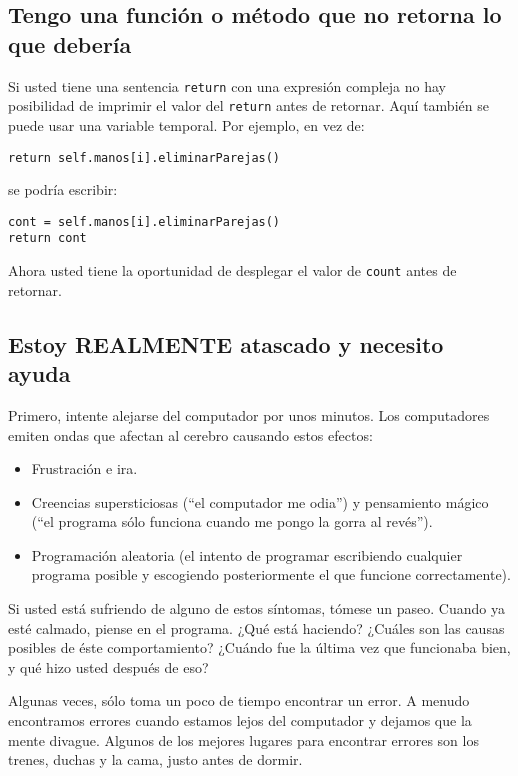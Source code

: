 \subsection{Tengo una función o método que no retorna lo que debería}

 

Si usted tiene una sentencia \texttt{return} con una expresión compleja
no hay posibilidad de imprimir el valor del \texttt{return} antes
de retornar. Aquí también se puede usar una variable temporal. Por
ejemplo, en vez de:

\begin{lstlisting}
return self.manos[i].eliminarParejas()
\end{lstlisting}
 se podría escribir:

\begin{lstlisting}
cont = self.manos[i].eliminarParejas()
return cont
\end{lstlisting}
 Ahora usted tiene la oportunidad de desplegar el valor de \texttt{count}
antes de retornar.

\subsection{Estoy REALMENTE atascado y necesito ayuda}

Primero, intente alejarse del computador por unos minutos. Los computadores
emiten ondas que afectan al cerebro causando estos efectos:
\begin{itemize}
\item Frustración e ira.
\item Creencias supersticiosas (``el computador me odia'') y pensamiento
mágico (``el programa sólo funciona cuando me pongo la gorra al revés'').
\item Programación aleatoria (el intento de programar escribiendo cualquier
programa posible y escogiendo posteriormente el que funcione correctamente).
\end{itemize}
Si usted está sufriendo de alguno de estos síntomas, tómese un paseo.
Cuando ya esté calmado, piense en el programa. ¿Qué está haciendo?
¿Cuáles son las causas posibles de éste comportamiento? ¿Cuándo fue
la última vez que funcionaba bien, y qué hizo usted después de eso?

Algunas veces, sólo toma un poco de tiempo encontrar un error. A menudo
encontramos errores cuando estamos lejos del computador y dejamos
que la mente divague. Algunos de los mejores lugares para encontrar
errores son los trenes, duchas y la cama, justo antes de dormir.

